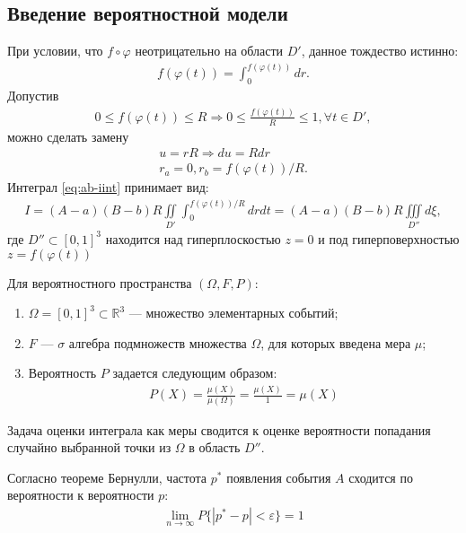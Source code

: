\subsection{Введение вероятностной модели}\label{method-1}
При условии, что \(f\circ\varphi\) неотрицательно на области \(D'\), данное тождество истинно:
\begin{align}
	f(\varphi(t)) = \int_0^{f(\varphi(t))}dr.
\end{align}
Допустив
\begin{align}
	0 \leq f(\varphi(t)) \leq R \Longrightarrow 0 \leq \frac{f(\varphi(t))}{R} \leq 1, \forall t \in D',
\end{align}
можно сделать замену
\begin{align}
	u = r R \Longrightarrow du = R dr \\
	r_a = 0, r_b = f(\varphi(t))/R.
\end{align}
Интеграл \cref{eq:ab-iint} принимает вид:
\begin{align}
	I = (A - a)(B - b)R\iint\limits_{D'}\int_0^{f(\varphi(t))/R}drdt = (A - a)(B - b)R \iiint\limits_{D''}d\xi,
\end{align}
где \(D'' \subset [0,1]^3\) находится над гиперплоскостью \(z = 0\) и под гиперповерхностью \(z =f(\varphi(t))\)

Для вероятностного пространства \((\Omega, F, P)\):
\begin{enumerate}
	\item \(\Omega = [0,1]^3 \subset \mathbb{R}^3\) --- множество элементарных событий;
	\item \(F\) --- \(\sigma\) алгебра подмножеств множества \(\Omega\), для которых введена мера \(\mu\);
	\item Вероятность \(P\) задается следующим образом:
	      \begin{align*}
		      P(X) = \frac{\mu(X)}{\mu(\Omega)} = \frac{\mu(X)}{1} = \mu(X)
	      \end{align*}
\end{enumerate}
Задача оценки интеграла как меры сводится к оценке вероятности попадания случайно выбранной точки из \(\Omega\) в область \(D''\).

Согласно теореме Бернулли, частота \(p^*\) появления события \(A\) сходится по вероятности к вероятности \(p\):
\begin{align}
	\lim_{n\to\infty}P\{|p^* - p| < \varepsilon \} = 1
\end{align}

